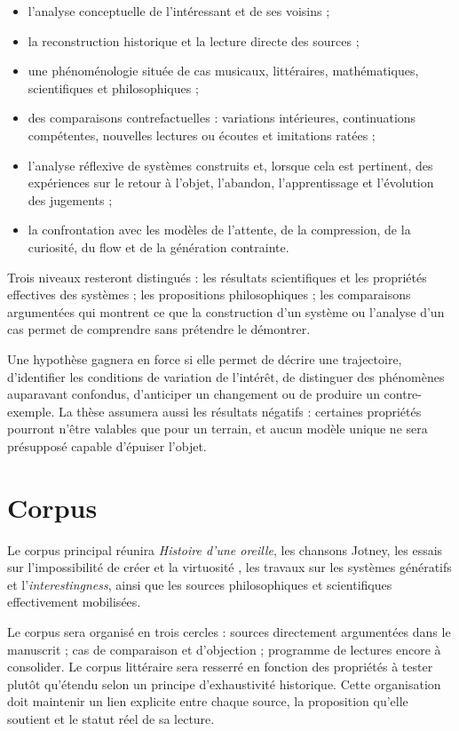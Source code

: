 \documentclass[11pt,a4paper]{article}
\begin{document}
\begin{itemize}
  \item l'analyse conceptuelle de l'intéressant et de ses voisins ;
  \item la reconstruction historique et la lecture directe des sources ;
  \item une phénoménologie située de cas musicaux, littéraires, mathématiques,
        scientifiques et philosophiques ;
  \item des comparaisons contrefactuelles : variations intérieures,
        continuations compétentes, nouvelles lectures ou écoutes et imitations ratées ;
  \item l'analyse réflexive de systèmes construits et, lorsque cela est
        pertinent, des expériences sur le retour à l'objet, l'abandon, l'apprentissage
        et l'évolution des jugements ;
  \item la confrontation avec les modèles de l'attente, de la compression, de
        la curiosité, du flow et de la génération contrainte.
\end{itemize}

Trois niveaux resteront distingués : les résultats scientifiques et les
propriétés effectives des systèmes ; les propositions philosophiques ; les
comparaisons argumentées qui montrent ce que la construction d'un système ou
l'analyse d'un cas permet de comprendre sans prétendre le démontrer.

Une hypothèse gagnera en force si elle permet de décrire une trajectoire,
d'identifier les conditions de variation de l'intérêt, de distinguer des
phénomènes auparavant confondus, d'anticiper un changement ou de produire un
contre-exemple. La thèse assumera aussi les résultats négatifs : certaines
propriétés pourront n'être valables que pour un terrain, et aucun modèle unique
ne sera présupposé capable d'épuiser l'objet.

\section{Corpus}

Le corpus principal réunira \emph{Histoire d'une oreille}, les chansons Jotney,
les essais sur l'impossibilité de créer et la virtuosité
\parencite{pachet2018oreille,pachet2026impossibilite,pachet2027virtuosite}, les
travaux sur les systèmes génératifs et l'\emph{interestingness}, ainsi que les
sources philosophiques et scientifiques effectivement mobilisées.

Le corpus sera organisé en trois cercles : sources directement argumentées dans
le manuscrit ; cas de comparaison et d'objection ; programme de lectures encore
à consolider. Le corpus littéraire sera resserré en fonction des propriétés à
tester plutôt qu'étendu selon un principe d'exhaustivité historique. Cette
organisation doit maintenir un lien explicite entre chaque source, la
proposition qu'elle soutient et le statut réel de sa lecture.
\end{document}
